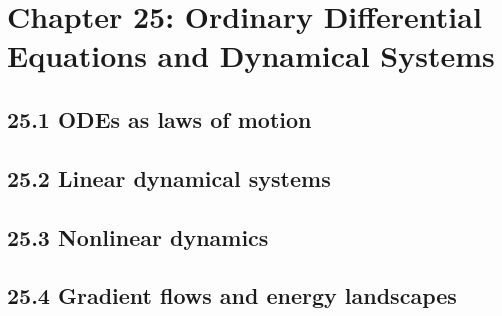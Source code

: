 \section{Chapter 25: Ordinary Differential Equations and Dynamical Systems}

\subsection{25.1 ODEs as laws of motion}

\subsection{25.2 Linear dynamical systems}

\subsection{25.3 Nonlinear dynamics}

\subsection{25.4 Gradient flows and energy landscapes}

\clearpage
